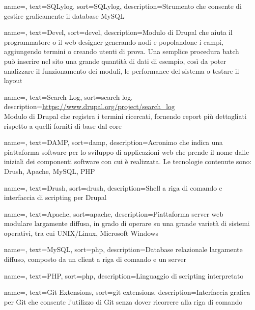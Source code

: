 {
	name=,
	text=SQLylog,
	sort=SQLylog,
	description={Strumento che consente di gestire graficamente il database MySQL}
}

{
	name=,
	text=Devel,
	sort=devel,
	description={Modulo di \gls{Drupal} che aiuta il programmatore o il web designer generando nodi e popolandone i campi, aggiungendo termini o creando utenti di prova. Una semplice procedura batch può inserire nel sito una grande quantità di dati di esempio, così da poter analizzare il funzionamento dei moduli, le performance del sistema o testare il layout}
}

{
	name=,
	text=Search Log,
	sort=search log,
	description={\url{https://www.drupal.org/project/search_log} \\
		Modulo di Drupal che registra i termini ricercati, fornendo report più dettagliati rispetto a quelli forniti di base dal core}
}

{
	name=,
	text=DAMP,
	sort=damp,
	description={Acronimo che indica una piattaforma software per lo sviluppo di applicazioni web che prende il nome dalle iniziali dei componenti software con cui è realizzata. Le tecnologie contenute sono: \gls{Drush}, \gls{Apache}, \gls{MySQL}, \gls{PHP}}
}

{
	name=,
	text=Drush,
	sort=drush,
	description={Shell a riga di comando e interfaccia di scripting per \gls{Drupal}}
}

{
	name=,
	text=Apache,
	sort=apache,
	description={Piattaforma server web modulare largamente diffusa, in grado di operare su una grande varietà di sistemi operativi, tra cui UNIX/Linux, Microsoft Windows}
}

{
	name=,
	text=MySQL,
	sort=php,
	description={Database relazionale largamente diffuso, composto da un client a riga di comando e un server}
}

{
	name=,
	text=PHP,
	sort=php,
	description={Linguaggio di scripting interpretato}
}

{
	name=,
	text=Git Extensions,
	sort=git extensions,
	description={Interfaccia grafica per \gls{Git} che consente l'utilizzo di \gls{Git} senza dover ricorrere alla riga di comando}
}


